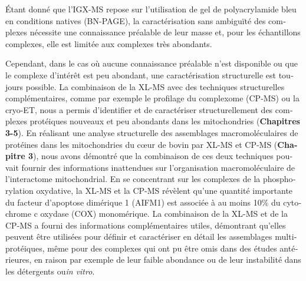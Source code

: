 \begin{otherlanguage}{french}
    Étant donné que l'IGX-MS repose sur l'utilisation de gel de polyacrylamide bleu en conditions natives (BN-PAGE), la caractérisation sans ambiguïté des complexes nécessite une connaissance préalable de leur masse et, pour les échantillons complexes, elle est limitée aux complexes très abondants.

    Cependant, dans le cas où aucune connaissance préalable n'est disponible ou que le complexe d'intérêt est peu abondant, une caractérisation structurelle est toujours possible. La combinaison de la XL-MS avec des techniques structurelles complémentaires, comme par exemple le profilage du complexome (CP-MS) ou la cryo-ET, nous a permis d'identifier et de caractériser structurellement des complexes protéiques nouveaux et peu abondants dans les mitochondries (\textbf{Chapitres 3-5}). En réalisant une analyse structurelle des assemblages macromoléculaires de protéines dans les mitochondries du cœur de bovin par XL-MS et CP-MS (\textbf{Chapitre 3}), nous avons démontré que la combinaison de ces deux techniques pouvait fournir des informations inattendues sur l'organisation macromoléculaire de l'interactome mitochondrial. En se concentrant sur les complexes de la phosphorylation oxydative, la XL-MS et la CP-MS révèlent qu'une quantité importante du facteur d'apoptose dimérique 1 (AIFM1) est associée à au moins 10\% du cytochrome c oxydase (COX) monomérique. La combinaison de la XL-MS et de la CP-MS a fourni des informations complémentaires utiles, démontrant qu'elles peuvent être utilisées pour définir et caractériser en détail les assemblages multiprotéiques, même pour des complexes qui ont pu être omis dans des études antérieures, en raison par exemple de leur faible abondance ou de leur instabilité dans les détergents ou\emph{in vitro}.


\end{otherlanguage}
